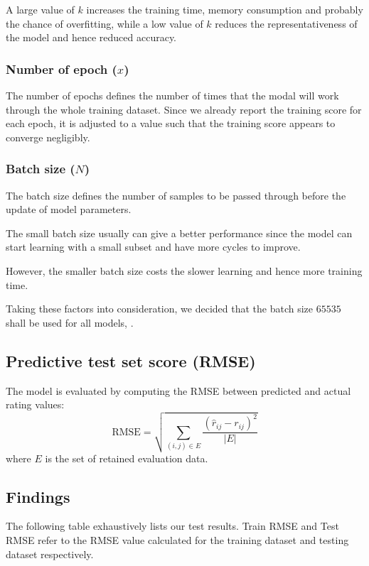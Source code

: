 \documentclass[final]{cvpr}
\begin{document}
A large value of $k$ increases the training time, memory consumption and probably the chance of overfitting,
while a low value of $k$ reduces the representativeness of the model and hence reduced accuracy.

\subsubsection{Number of epoch ($x$)}
The number of epochs defines the number of times that the modal will work through the whole training dataset.
Since we already report the training score for each epoch, it is adjusted to a value such that the training score appears to converge negligibly.

\subsubsection{Batch size ($N$)}
The batch size defines the number of samples to be passed through before the update of model parameters.

The small batch size usually can give a better performance since the model can start learning with a small subset and have more cycles to improve.

However, the smaller batch size costs the slower learning and hence more training time.

Taking these factors into consideration, we decided that the batch size $65535$ shall be used for all models, .

\subsection{Predictive test set score (RMSE)}
The model is evaluated by computing the RMSE between predicted and actual rating values:
$$ \text{RMSE} = \sqrt{\sum_{(i, j) \in E} \frac{{(\hat r_{ij} - r_{ij})}^2}{\left| E \right|}} $$
where $E$ is the set of retained evaluation data.


\subsection{Findings}

The following table exhaustively lists our test results. Train RMSE and Test RMSE refer to the RMSE value calculated for the training dataset and testing dataset respectively.
\end{document}
